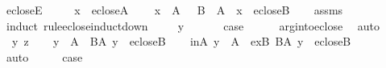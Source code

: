 \begin{isabellebody}
%
\endisadelimproof
\isanewline
{}\isamarkupfalse%
\ ecloseE\ {\isacharcolon}{\kern0pt}\isanewline
\ \ \ \ {\isachardoublequoteopen}x\ {\isasymin}\ eclose{\isacharparenleft}{\kern0pt}A{\isacharparenright}{\kern0pt}{\isachardoublequoteclose}\isanewline
\ \ \ \ {\isachardoublequoteopen}x\ {\isasymin}\ A\ {\isasymor}\ {\isacharparenleft}{\kern0pt}{\isasymexists}\ B\ {\isasymin}\ A\ {\isachardot}{\kern0pt}\ x\ {\isasymin}\ eclose{\isacharparenleft}{\kern0pt}B{\isacharparenright}{\kern0pt}{\isacharparenright}{\kern0pt}{\isachardoublequoteclose}\isanewline
%
\isadelimproof
\ \ %
\endisadelimproof
%
\isatagproof
{}\isamarkupfalse%
\ assms\isanewline
{}\isamarkupfalse%
\ {\isacharparenleft}{\kern0pt}induct\ rule{\isacharcolon}{\kern0pt}eclose{\isacharunderscore}{\kern0pt}induct{\isacharunderscore}{\kern0pt}down{\isacharparenright}{\kern0pt}\isanewline
\ \ \isamarkupfalse%
\ {\isacharparenleft}{\kern0pt}{}\ y{\isacharparenright}{\kern0pt}\isanewline
\ \ \isamarkupfalse%
\isanewline
\ \ \isamarkupfalse%
\ {\isacharquery}{\kern0pt}case\isanewline
\ \ \ \ \isamarkupfalse%
\ arg{\isacharunderscore}{\kern0pt}into{\isacharunderscore}{\kern0pt}eclose\ \isamarkupfalse%
\ auto\isanewline
{}\isamarkupfalse%
\isanewline
\ \ \isamarkupfalse%
\ {\isacharparenleft}{\kern0pt}{}\ y\ z{\isacharparenright}{\kern0pt}\isanewline
\ \ \isamarkupfalse%
\ {\isacartoucheopen}y\ {\isasymin}\ A\ {\isasymor}\ {\isacharparenleft}{\kern0pt}{\isasymexists}B{\isasymin}A{\isachardot}{\kern0pt}\ y\ {\isasymin}\ eclose{\isacharparenleft}{\kern0pt}B{\isacharparenright}{\kern0pt}{\isacharparenright}{\kern0pt}{\isacartoucheclose}\isanewline
\ \ \isamarkupfalse%
\ {\isacharparenleft}{\kern0pt}inA{\isacharparenright}{\kern0pt}\ {\isachardoublequoteopen}y\ {\isasymin}\ A{\isachardoublequoteclose}\ {\isacharbar}{\kern0pt}\ {\isacharparenleft}{\kern0pt}exB{\isacharparenright}{\kern0pt}\ {\isachardoublequoteopen}{\isacharparenleft}{\kern0pt}{\isasymexists}B{\isasymin}A{\isachardot}{\kern0pt}\ y\ {\isasymin}\ eclose{\isacharparenleft}{\kern0pt}B{\isacharparenright}{\kern0pt}{\isacharparenright}{\kern0pt}{\isachardoublequoteclose}\isanewline
\ \ \ \ \isamarkupfalse%
\ auto\isanewline
\ \ \isamarkupfalse%
\ \isamarkupfalse%
\ {\isacharquery}{\kern0pt}case\isanewline
\ \ \isamarkupfalse%

\end{isabellebody}
